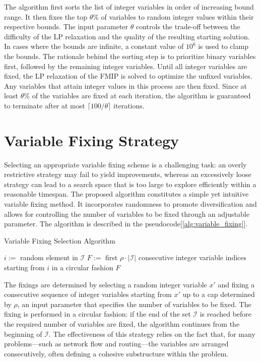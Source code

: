 The algorithm first sorts the list of integer variables in order of increasing bound range. It then fixes the top $\theta$\% of variables to random integer values within their respective bounds. The input parameter $\theta$ controls the trade-off between the difficulty of the LP relaxation and the quality of the resulting starting solution. In cases where the bounds are infinite, a constant value of $10^6$ is used to clamp the bounds.
The rationale behind the sorting step is to prioritize binary variables first, followed by the remaining integer variables.
Until all integer variables are fixed, the LP relaxation of the FMIP is solved to optimize the unfixed variables. Any variables that attain integer values in this process are then fixed.
Since at least $\theta$\% of the variables are fixed at each iteration, the algorithm is guaranteed to terminate after at most $\lceil 100 / \theta \rceil$ iterations.
\section{Variable Fixing Strategy}\label{sec:PACS_var_fix}
Selecting an appropriate variable fixing scheme is a challenging task: an overly restrictive strategy may fail to yield improvements, whereas an excessively loose strategy can lead to a search space that is too large to explore efficiently within a reasonable timespan.
The proposed algorithm constitutes a simple yet intuitive variable fixing method. It incorporates randomness to promote diversification and allows for controlling the number of variables to be fixed through an adjustable parameter.
The algorithm is described in the  pseudocode[\ref{alg:variable_fixing}].
\begin{algorithm}
\caption{Variable Fixing Selection Algorithm}\label{alg:variable_fixing}
\begin{algorithmic}[1]
    \State $i :=$ random element in $\mathcal{I}$
    \State $F :=$ first $\rho \cdot |\mathcal{I}|$ consecutive integer variable indices starting from $i$ in a circular fashion
    \State \Return $F$
\EndFunction
\end{algorithmic}
\end{algorithm}
The fixings are determined by selecting a random integer variable $x'$ and fixing a consecutive sequence of integer variables starting from $x'$ up to a cap determined by $\rho$, an input parameter that specifies the number of variables to be fixed. The fixing is performed in a circular fashion: if the end of the set $\mathcal{I}$ is reached before the required number of variables are fixed, the algorithm continues from the beginning of $\mathcal{I}$.
The effectiveness of this strategy relies on the fact that, for many problems—such as network flow and routing—the variables are arranged consecutively, often defining a cohesive substructure within the problem.
